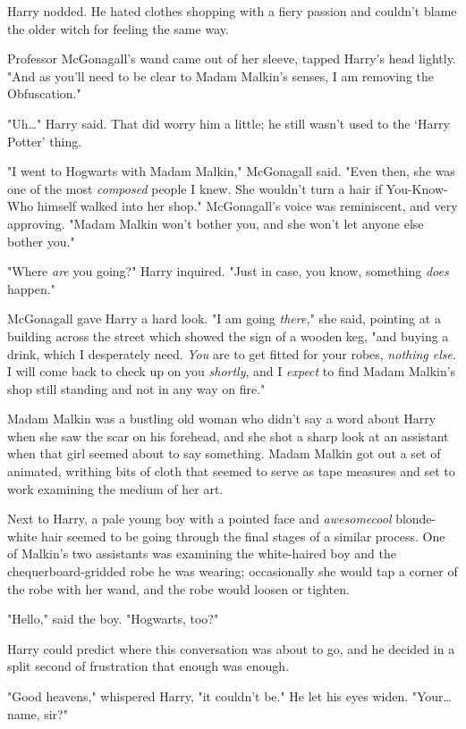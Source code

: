 Harry nodded. He hated clothes shopping with a fiery passion and couldn't blame
the older witch for feeling the same way.

Professor McGonagall's wand came out of her sleeve, tapped Harry's head
lightly. "And as you'll need to be clear to Madam Malkin's senses, I am
removing the Obfuscation."

"Uh{\ldots}" Harry said. That did worry him a little; he still wasn't used to
the `Harry Potter' thing.

"I went to Hogwarts with Madam Malkin," McGonagall said. "Even then, she was
one of the most \emph{composed} people I knew. She wouldn't turn a hair if
You-Know-Who himself walked into her shop." McGonagall's voice was reminiscent,
and very approving. "Madam Malkin won't bother you, and she won't let anyone
else bother you."

"Where \emph{are} you going?" Harry inquired. "Just in case, you know,
something \emph{does} happen."

McGonagall gave Harry a hard look. "I am going \emph{there,}" she said,
pointing at a building across the street which showed the sign of a wooden keg,
"and buying a drink, which I desperately need. \emph{You} are to get fitted for
your robes, \emph{nothing else}. I will come back to check up on you
\emph{shortly}, and I \emph{expect} to find Madam Malkin's shop still standing
and not in any way on fire."

Madam Malkin was a bustling old woman who didn't say a word about Harry when
she saw the scar on his forehead, and she shot a sharp look at an assistant
when that girl seemed about to say something. Madam Malkin got out a set of
animated, writhing bits of cloth that seemed to serve as tape measures and set
to work examining the medium of her art.

Next to Harry, a pale young boy with a pointed face and \emph{awesomecool}
blonde-white hair seemed to be going through the final stages of a similar
process. One of Malkin's two assistants was examining the white-haired boy and
the chequerboard-gridded robe he was wearing; occasionally she would tap a
corner of the robe with her wand, and the robe would loosen or tighten.

"Hello," said the boy. "Hogwarts, too?"

Harry could predict where this conversation was about to go, and he decided in
a split second of frustration that enough was enough.

"Good heavens," whispered Harry, "it couldn't be." He let his eyes widen.
"Your{\ldots} name, sir?"

